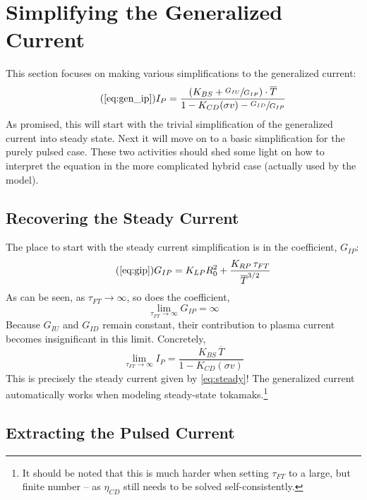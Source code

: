 \section{Simplifying the Generalized Current}

This section focuses on making various simplifications to the generalized current:
\begin{equation}
	\tag{\ref{eq:gen_ip}}
	I_P = \frac{ \left( K_{BS} + \sfrac{ G_{IU} }{ G_{IP} } \right) \cdot \overline T }{ 1 - K_{CD} ( \sigma v ) - \sfrac{ G_{ID} }{ G_{IP} } }
\end{equation}
As promised, this will start with the trivial simplification of the generalized current into steady state. Next it will move on to a basic simplification for the purely pulsed case. These two activities should shed some light on how to interpret the equation in the more complicated hybrid case (actually used by the model).

\subsection{Recovering the Steady Current}

The place to start with the steady current simplification is in the  coefficient, $G_{IP}$:
\begin{equation}
	\tag{\ref{eq:gip}}
	G_{IP} = K_{LP} R_0^2 + \frac{ K_{RP} \, \tau_{FT} }{ \overline T ^ {3/2} }
\end{equation}
As can be seen, as $\tau_{FT} \to \infty$, so does the coefficient,
\begin{equation}
	\lim_{\tau_{FT} \to \infty} G_{IP} = \infty
\end{equation}
Because $G_{IU}$ and $G_{ID}$ remain constant, their contribution to plasma current becomes insignificant in this limit. Concretely,
\begin{equation}
	\label{eq:tau_inf}
	\lim_{\tau_{FT} \to \infty} I_P = \frac{ K_{BS} \, \overline T }{ 1 - K_{CD} ( \sigma v ) }
\end{equation}
This is precisely the steady current given by \cref{eq:steady}! The generalized current automatically works when modeling steady-state tokamaks.\footnote{It should be noted that this is much harder when setting $\tau_{FT}$ to a large, but finite number -- as $\eta_{CD}$ still needs to be solved self-consistently. }

\subsection{Extracting the Pulsed Current}

